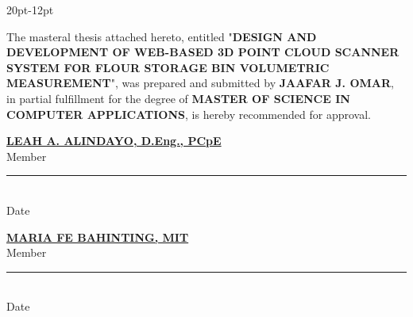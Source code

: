 \begin{adjustwidth}{20pt}{-12pt}
	\begin{singlespace}
		The masteral thesis attached hereto, entitled "\MakeUppercase{\textbf{Design and Development of Web-based 3D Point Cloud Scanner System for Flour Storage Bin Volumetric Measurement}}", was prepared and submitted by \textbf{JAAFAR J. OMAR}, in partial fulfillment for the degree of \textbf{MASTER OF SCIENCE IN COMPUTER APPLICATIONS}, is hereby recommended for approval.
	\end{singlespace}
\end{adjustwidth}

\vspace{0.7cm}
\begin{center}
	\begin{minipage}{0.54\textwidth}
		\begin{center}
			\textbf{\underline{\MakeUppercase{Leah A. Alindayo}, D.Eng., PCpE}} \\ [-0.5\baselineskip]
			Member\\
			\rule{2.5cm}{0.25pt}\\ [-0.5\baselineskip]
			\hspace{0.5cm} %
			Date
		\end{center}
	\end{minipage}
	\hfill
	\begin{minipage}{0.45\textwidth}
		\begin{center}
			\textbf{\underline{\MakeUppercase{Maria Fe Bahinting}, MIT}}\\ [-0.5\baselineskip]
			Member\\
			\rule{2.5cm}{0.25pt}\\ [-0.5\baselineskip]
			\hspace{0.5cm} %
			Date
		\end{center}
	\end{minipage}
\end{center}

